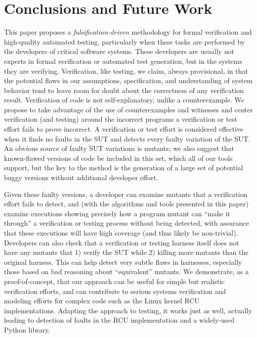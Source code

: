 \documentclass{svjour3}
\begin{document}
\section{Conclusions and Future Work}

This paper proposes a \emph{falsification-driven} methodology for
formal verification and high-quality automated testing, particularly
when these tasks are performed by
the developers of critical software systems.  These developers are
usually not
experts in formal verification or automated test generation, but in the systems they are verifying.
Verification, like testing, we claim, always provisional, in that the potential
flaws in our assumptions, specification, and understanding of system
behavior tend to leave room for doubt about the correctness of any
verification result.  Verification of code is not self-explanatory,
unlike a counterexample.  We propose to take advantage of the use of
counterexamples and witnesses and center verification (and testing) around the
incorrect programs a verification or test effort fails to prove incorrect.  A
verification or test effort is considered effective when it finds no faults in the
SUT and detects every faulty variation of the SUT.  An
obvious source of faulty SUT variations is mutants; we also suggest that
known-flawed versions of code be included in this set, which all of
our tools support, but the key to the method is the generation of a
large set of potential buggy versions without additional developer
effort.  

Given
these faulty versions, a developer can examine mutants that a verification
effort fails to detect, and (with the algorithms and tools presented
in this paper) examine executions showing precisely how a program
mutant can ``make it through'' a verification or testing process without being detected,
with assurance that these executions will have high coverage (and thus
likely be non-trivial).  Developers can also check that a verification
or testing harness itself does not have any mutants that 1) verify the SUT while 2) killing
more mutants than the original harness.  This can help detect
very subtle flaws in harnesses, especially those based on bad
reasoning about ``equivalent'' mutants.  We demonstrate, as a
proof-of-concept, that our approach can be useful for simple but
realistic verification efforts, and can contribute to serious systems
verification and modeling efforts for complex code such as the Linux
kernel RCU implementations.  Adapting the approach to testing, it
works just as well, actually leading to detection of faults in the RCU
implementation and a widely-used Python library.
\end{document}
